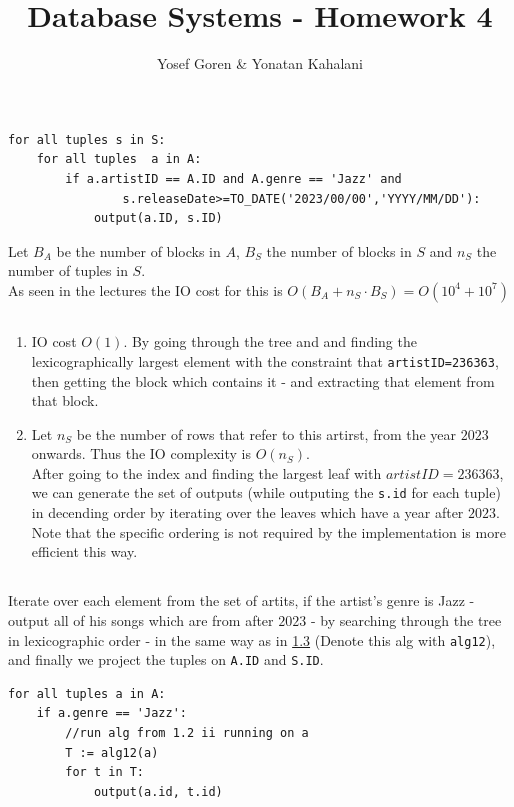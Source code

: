 \documentclass{article}
\begin{document}
\author{Yosef Goren \& Yonatan Kahalani}
\title{Database Systems - Homework 4}
\maketitle


\section{}
\subsection{}
\begin{lstlisting}
for all tuples s in S:
    for all tuples  a in A:
        if a.artistID == A.ID and A.genre == 'Jazz' and
                s.releaseDate>=TO_DATE('2023/00/00','YYYY/MM/DD'):
            output(a.ID, s.ID)
\end{lstlisting}
Let $B_A$ be the number of blocks in $A$,
$B_S$ the number of blocks in $S$ and $n_S$
the number of tuples in $S$.\\
As seen in the lectures the IO
cost for this is $O(B_A+n_S\cdot B_S)=O(10^4+10^7)$

\subsection{}
\begin{enumerate}[label=\roman*.]
    \item IO cost $O(1)$. By going through the tree and
    and finding the lexicographically largest element with
    the constraint that \texttt{artistID=236363}, then getting
    the block which contains it - and extracting that element from that block.
    \item
    \label{}
    Let $n_S$ be the number of rows that refer to this artirst,
    from the year $2023$ onwards. Thus the IO complexity is $O(n_S)$.\\
    After going to the index and finding the largest leaf with $artistID=236363$,
    we can generate the set of outputs (while outputing the \texttt{s.id} for each tuple) in decending order
    by iterating over
    the leaves which have a year after $2023$.\\
    Note that the specific ordering is not required by the implementation is more efficient this way.
\end{enumerate}

\subsection{}
Iterate over each element from the set of artits,
if the artist's genre is Jazz - output all of his songs which are from after $2023$ -
by searching through the tree in lexicographic order - in the same way as in \ref{} (Denote this alg with \texttt{alg12}),
and finally we project the tuples on \texttt{A.ID} and \texttt{S.ID}.
\begin{lstlisting}
for all tuples a in A:
    if a.genre == 'Jazz':
        //run alg from 1.2 ii running on a
        T := alg12(a)
        for t in T:
            output(a.id, t.id)
\end{lstlisting}
\end{document}
